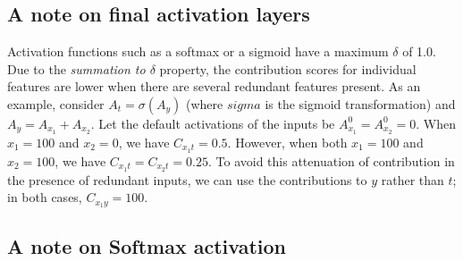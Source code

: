 \documentclass{article}
\begin{document}

\subsection{A note on final activation layers}

Activation functions such as a softmax or a sigmoid have a maximum $\delta$ of 1.0. Due to the \emph{summation to $\delta$} property, the contribution scores for individual features are lower when there are several redundant features present. As an example, consider $A_t = \sigma(A_y)$ (where $sigma$ is the sigmoid transformation) and $A_y = A_{x_1} + A_{x_2}$. Let the default activations of the inputs be $A_{x_1}^0 = A_{x_2}^0 = 0$. When $x_1 = 100$ and $x_2 = 0$, we have $C_{x_1 t} = 0.5$. However, when both $x_1 = 100$ and $x_2 = 100$, we have $C_{x_1 t} = C_{x_2 t} = 0.25$. To avoid this attenuation of contribution in the presence of redundant inputs, we can use the contributions to $y$ rather than $t$; in both cases, $C_{x_1 y} = 100$.

\subsection{A note on Softmax activation}
\end{document}
